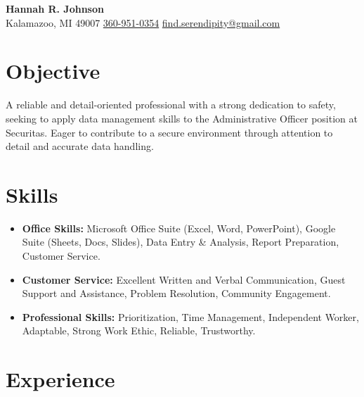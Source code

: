\documentclass[a4paper,11pt]{article}
\begin{document}
\begin{center}
    {\LARGE \textbf{Hannah R. Johnson}} \\
    \vspace{1mm}
    Kalamazoo, MI 49007 \textbar{} \href{tel:360-951-0354}{360-951-0354} \textbar{} \href{mailto:find.serendipity@gmail.com}{find.serendipity@gmail.com}
\end{center}

\section{Objective}
A reliable and detail-oriented professional with a strong dedication to safety, seeking to apply data management skills to the Administrative Officer position at Securitas. Eager to contribute to a secure environment through attention to detail and accurate data handling.

\section{Skills}

\begin{itemize}[leftmargin=*, nosep]
    \item \textbf{Office Skills:} Microsoft Office Suite (Excel, Word, PowerPoint), Google Suite (Sheets, Docs, Slides), Data Entry \& Analysis, Report Preparation, Customer Service.
    \item \textbf{Customer Service:} Excellent Written and Verbal Communication, Guest Support and Assistance, Problem Resolution, Community Engagement.
    \item \textbf{Professional Skills:} Prioritization, Time Management, Independent Worker, Adaptable, Strong Work Ethic, Reliable, Trustworthy.
\end{itemize}

\section{Experience}
\end{document}
